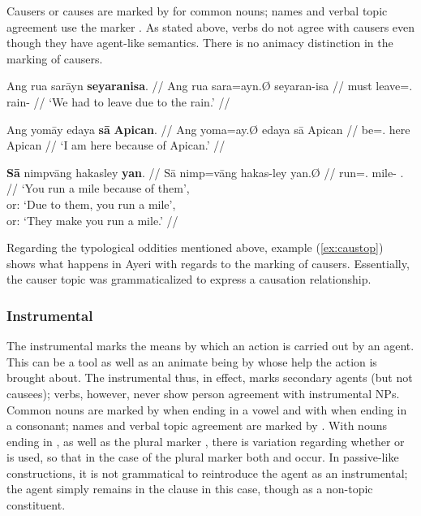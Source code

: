 Causers or causes are marked by  for common nouns; names and
verbal topic agreement use the marker . As stated above, verbs do
not agree with causers even though they have agent-like semantics. There is no
animacy distinction in the marking of causers.

\pex
\a\begingl
	\gla Ang rua sarāyn \textbf{seyaranisa}. //
	\glb Ang rua sara=ayn.Ø seyaran-isa //
	\glc \AgtT{} must leave=\Fpl{}.\Top{} rain-\Caus{} //
	\glft `We had to leave due to the rain.' //
\endgl

\a\begingl
	\gla Ang yomāy edaya \textbf{sā} \textbf{Apican}. //
	\glb Ang yoma=ay.Ø edaya sā Apican //
	\glc \AgtT{} be=\Fsg{}.\Top{} here \Caus{} Apican //
	\glft `I am here because of Apican.' //
\endgl

\a\label{ex:caustop}\begingl
	\gla \textbf{Sā} nimpvāng hakasley \textbf{yan}. //
	\glb Sā nimp=vāng hakas-ley yan.Ø //
	\glc \CauT{} run=\Ssg{}.\Aarg{} mile-\PargI{} \TplM{}.\Top{} //
	\glft `You run a mile because of them',\\
		or: `Due to them, you run a mile',\\
		or: `They make you run a mile.' //
\endgl

\xe

Regarding the typological oddities mentioned above, example (\ref{ex:caustop}) 
shows what happens in Ayeri with regards to the marking of causers. 
Essentially, the causer topic was grammaticalized to express a causation 
relationship.


\subsubsection{Instrumental}
\label{subsubsec:instrumental}

The instrumental marks the means by which an action is carried out by an agent.
This can be a tool as well as an animate being by whose help the action is
brought about. The instrumental thus, in effect, marks secondary agents (but
not causees); verbs, however, never show person agreement with instrumental
NPs. Common nouns are marked by  when ending in a vowel and with
 when ending in a consonant; names and verbal topic agreement
are marked by . With nouns ending in , as well as the
plural marker , there is variation regarding whether
 or  is used, so that in the case of the plural
marker both  and  occur. In passive-like
constructions, it is not grammatical to reintroduce the agent as an
instrumental; the agent simply remains in the clause in this case, though as a
non-topic constituent.

